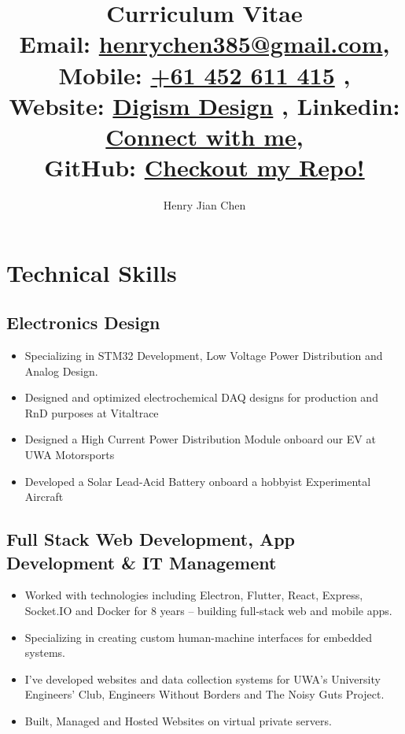 \documentclass{article}[a4page]
\title{
Curriculum Vitae \\
\small{Email: \href{mailto:henrychen385@gmail.com}{henrychen385@gmail.com}}, 
\small{Mobile: \href{tel:61452611415}{+61 452 611 415} }, \\
\small{Website:  \href{https://digism.xyz}{Digism Design} },
\small{Linkedin: \href{https://www.linkedin.com/in/henry-chen-21b672176/}{Connect with me}},\\
\small{GitHub: \href{https://github.com/jumper385}{Checkout my Repo!}}
}
\author{Henry Jian Chen}
\begin{document}
\maketitle
{}

\section*{Technical Skills}
\subsection*{Electronics Design}
\begin{itemize}
    \item Specializing in STM32 Development, Low Voltage Power Distribution and Analog Design.
    \item Designed and optimized electrochemical DAQ designs for production and RnD purposes at Vitaltrace 
    \item Designed a High Current Power Distribution Module onboard our EV at UWA Motorsports
    \item Developed a Solar Lead-Acid Battery onboard a hobbyist Experimental Aircraft
\end{itemize}

\subsection*{Full Stack Web Development, App Development \& IT Management \hfill}
\begin{itemize}
\item Worked with technologies including Electron, Flutter, React, Express, Socket.IO and Docker for 8 years – building full-stack web and mobile apps.
\item Specializing in creating custom human-machine interfaces for embedded systems.
\item I've developed websites and data collection systems for UWA's University Engineers' Club, Engineers Without Borders and The Noisy Guts Project.
\item Built, Managed and Hosted Websites on virtual private servers.
\end{itemize}
\end{document}
